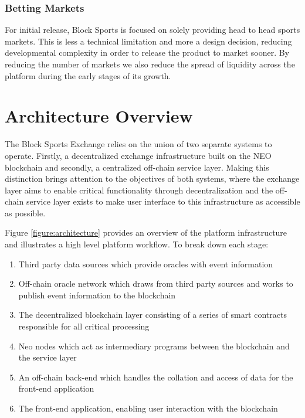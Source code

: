\documentclass{article}
\begin{document}
		\subsubsection{Betting Markets} \label{betting-markets}
For initial release, Block Sports is focused on solely providing head to head sports markets. This is less a technical limitation and more a design decision, reducing developmental complexity in order to release the product to market sooner. By reducing the number of markets we also reduce the spread of liquidity across the platform during the early stages of its growth.

\section{Architecture Overview} \label{architecture-overview}
The Block Sports Exchange relies on the union of two separate systems to operate. Firstly, a decentralized exchange infrastructure built on the NEO blockchain and secondly, a centralized  off-chain service layer. Making this distinction brings attention to the objectives of both systems, where the exchange layer aims to enable critical functionality through decentralization and the off-chain service layer exists to make user interface to this infrastructure as accessible as possible.

Figure \ref{figure:architecture} provides an overview of the platform infrastructure and illustrates a high level platform workflow. To break down each stage:
\begin{enumerate}[label=(\alph*)]
	\item Third party data sources which provide oracles with event information
	\item Off-chain oracle network which draws from third party sources and works to publish event information to the blockchain
	\item The decentralized blockchain layer consisting of a series of smart contracts responsible for all critical processing
	\item Neo nodes which act as intermediary programs between the blockchain and the service layer
	\item An off-chain back-end which handles the collation and access of data for the front-end application
	\item The front-end application, enabling user interaction with the blockchain
\end{enumerate}
\end{document}
